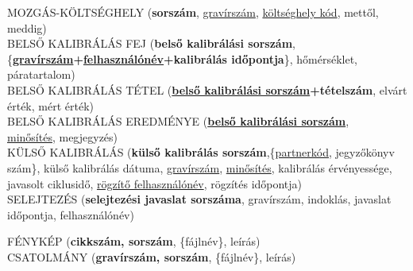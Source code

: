 \documentclass[a4paper,12pt]{report}
\newcommand{\pk}[1]{\textbf{#1}} %
\newcommand{\fk}[1]{\underline{#1}} %
\newcommand{\tabla}[1]{\noindent\MakeUppercase{#1}} %
\begin{document}
\tabla{mozgás-költséghely} (\pk{sorszám}, \fk{gravírszám}, \fk{költséghely kód}, mettől,
meddig)\\

\tabla{belső kalibrálás fej} (\pk{belső kalibrálási sorszám},\\ \{\pk{\fk{gravírszám}+\fk{felhasználónév}+kalibrálás időpontja}\}, hőmérséklet, 
páratartalom)\\

\tabla{belső kalibrálás tétel} (\pk{\fk{belső kalibrálási sorszám}+tételszám}, elvárt érték,
mért érték)\\

\tabla{belső kalibrálás eredménye} (\pk{\fk{belső kalibrálási sorszám}},\\ \fk{minősítés},
megjegyzés)\\

\tabla{külső kalibrálás} (\pk{külső kalibrálás sorszám},\{\fk{partnerkód}, jegyzőkönyv szám\}, külső kalibrálás dátuma, \fk{gravírszám}, \fk{minősítés}, kalibrálás érvényessége, 
javasolt ciklusidő, \fk{rögzítő felhasználónév}, rögzítés időpontja)\\

\tabla{selejtezés} (\pk{selejtezési javaslat sorszáma}, gravírszám, indoklás, javaslat időpontja, felhasználónév)

\tabla{fénykép} (\pk{cikkszám, sorszám}, \{fájlnév\}, leírás)\\

\tabla{csatolmány} (\pk{gravírszám, sorszám}, \{fájlnév\}, leírás)\\







%



%

%
% 
\end{document}
